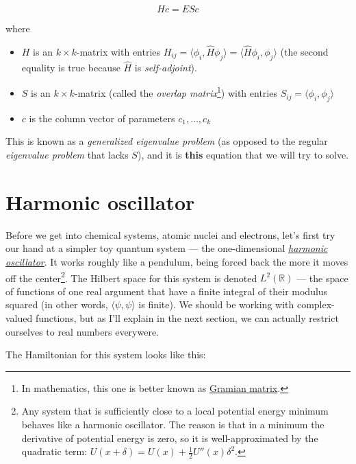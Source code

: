 \documentclass{article}
\begin{document}
\begin{equation} \label{eq:var} H c = E S c \end{equation}

where

\begin{itemize}
\item \(H\) is an \(k\times k\)-matrix with entries \(H_{ij} = \langle \phi_i, \hat H \phi_j \rangle = \langle \hat H \phi_i, \phi_j \rangle\) (the second equality is true because \(\hat H\) is \textit{self-adjoint}).
\item \(S\) is an \(k\times k\)-matrix (called the \textit{overlap matrix}\footnote{In mathematics, this one is better known as \href{https://en.wikipedia.org/wiki/Gramian_matrix}{Gramian matrix}.}) with entries \(S_{ij} = \langle \phi_i, \phi_j \rangle\)
\item \(c\) is the column vector of parameters \(c_1, \dots, c_k\)
\end{itemize}

This is known as a \textit{generalized eigenvalue problem} (as opposed to the regular \textit{eigenvalue problem} that lacks \(S\)), and it is \textbf{this} equation that we will try to solve.

\section{Harmonic oscillator} \label{sec:harmonic}

Before we get into chemical systems, atomic nuclei and electrons, let's first try our hand at a simpler toy quantum system --- the one-dimensional \href{https://en.wikipedia.org/wiki/Quantum_harmonic_oscillator}{\textit{harmonic oscillator}}. It works roughly like a pendulum, being forced back the more it moves off the center\footnote{Any system that is sufficiently close to a local potential energy minimum behaves like a harmonic oscillator. The reason is that in a minimum the derivative of potential energy is zero, so it is well-approximated by the quadratic term: \(U(x+\delta)=U(x)+\frac{1}{2}U''(x)\delta^2\).}. The Hilbert space for this system is denoted \(L^2(\mathbb R)\) --- the space of functions of one real argument that have a finite integral of their modulus squared (in other words, \(\langle \psi, \psi \rangle\) is finite). We should be working with complex-valued functions, but as I'll explain in the next section, we can actually restrict ourselves to real numbers everywere.

The Hamiltonian for this system looks like this:
\end{document}
